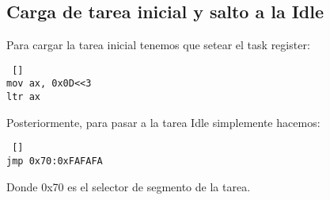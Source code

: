 \subsection*{Carga de  tarea inicial y salto a la Idle}
\par{Para cargar la tarea inicial tenemos que setear el task register:}
\begin{lstlisting} []
mov ax, 0x0D<<3
ltr ax
\end{lstlisting}
\par{Posteriormente, para pasar a la tarea Idle simplemente hacemos:}
\begin{lstlisting} []
jmp 0x70:0xFAFAFA
\end{lstlisting}
\par{Donde 0x70 es el selector de segmento de la tarea.}